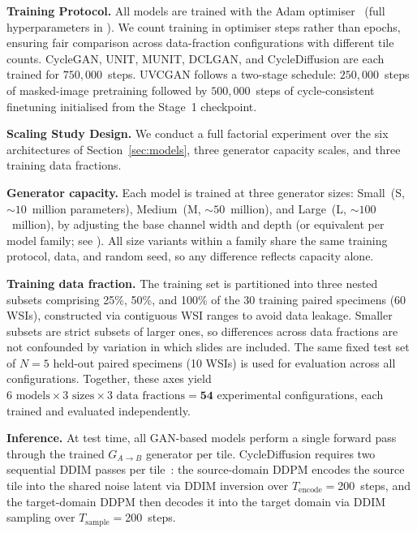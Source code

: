 

\textbf{Training Protocol.}
All models are trained with the Adam optimiser~\cite{kingma2015adam} (full hyperparameters
in ). We count training in optimiser steps rather than epochs,
ensuring fair comparison across data-fraction configurations with different tile counts.
CycleGAN, UNIT, MUNIT, DCLGAN, and CycleDiffusion are each trained for $750{,}000$~steps.
UVCGAN follows a two-stage schedule: $250{,}000$~steps of masked-image pretraining
followed by $500{,}000$~steps of cycle-consistent finetuning initialised from the
Stage~1 checkpoint.

\noindent\textbf{Scaling Study Design.}
We conduct a full factorial experiment over the six architectures of
Section~\ref{sec:models}, three generator capacity scales, and three training data
fractions.

\noindent\textbf{Generator capacity.}
Each model is trained at three generator sizes: Small~(S, ${\sim}10$~million parameters),
Medium~(M, ${\sim}50$~million), and Large~(L, ${\sim}100$~million), by adjusting the
base channel width and depth (or equivalent per model family; see ).
All size variants within a family share the same training protocol, data, and random
seed, so any difference reflects capacity alone.

\noindent\textbf{Training data fraction.}
The training set is partitioned into three nested subsets comprising 25\%, 50\%, and
100\% of the 30 training paired specimens (60 WSIs), constructed via contiguous WSI ranges
to avoid data leakage.
Smaller subsets are strict subsets of larger ones, so differences across data fractions
are not confounded by variation in which slides are included.
The same fixed test set of $N{=}5$ held-out paired specimens (10 WSIs) is used for
evaluation across all configurations.
Together, these axes yield $6\text{ models} \times 3\text{ sizes} \times 3\text{ data
fractions} = \mathbf{54}$ experimental configurations, each trained and evaluated
independently.

\noindent\textbf{Inference.}
At test time, all GAN-based models perform a single forward pass through the trained
$G_{A \to B}$ generator per tile.
CycleDiffusion requires two sequential DDIM passes per tile~\cite{song2021ddim}: the
source-domain DDPM encodes the source tile into the shared noise latent via DDIM
inversion over $T_{\text{encode}}{=}$200~steps, and the target-domain DDPM then decodes
it into the target domain via DDIM sampling over $T_{\text{sample}}{=}$200~steps.


